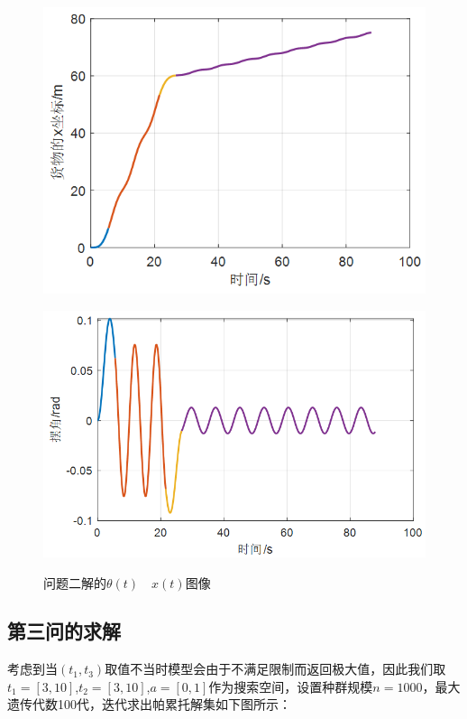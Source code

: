 \documentclass[withoutpreface,bwprint]{cumcmthesis} %
\begin{document}
\begin{figure}[!h]
    \centering
    \begin{minipage}[c]{0.48\textwidth}
        \centering
        \includegraphics[width=\textwidth]{p2x.png}
        \label{fig:sample-figure-a}
    \end{minipage}
    \begin{minipage}[c]{0.48\textwidth}
        \centering
        \includegraphics[width=\textwidth]{p2theta.png}
        \label{fig:sample-figure-b}
    \end{minipage}
    \caption{问题二解的$\theta(t)\quad x(t)$图像}
    \label{fig:sample-figure}
\end{figure}

\subsection{第三问的求解}
考虑到当$(t_1,t_3)$取值不当时模型会由于不满足限制而返回极大值，因此我们取$t_1=[3,10]$,$t_2=[3,10]$,$a=[0,1]$作为搜索空间，设置种群规模$n=1000$，最大遗传代数100代，迭代求出帕累托解集如下图所示：
\end{document}
